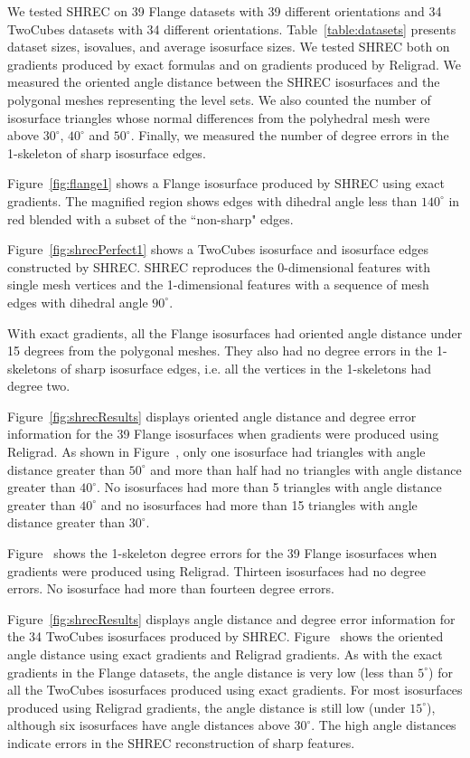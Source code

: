 We tested SHREC on 39 Flange datasets with 39 different orientations
and 34 TwoCubes datasets with 34 different orientations.
Table~\ref{table:datasets} presents dataset sizes, isovalues,
and average isosurface sizes.
We tested SHREC both on gradients produced by exact formulas 
and on gradients produced by Religrad.
We measured the oriented angle distance between the SHREC isosurfaces
and the polygonal meshes representing the level sets.
We also counted the number of isosurface triangles whose normal differences
from the polyhedral mesh were above $30^\circ$, $40^\circ$ and $50^\circ$.
Finally, we measured the number of degree errors 
in the 1-skeleton of sharp isosurface edges.

Figure~\ref{fig:flange1} shows a Flange isosurface produced by SHREC
using exact gradients.
The magnified region shows edges with dihedral angle
less than $140^\circ$ in red blended with a subset of the ``non-sharp"
edges.

Figure~\ref{fig:shrecPerfect1} shows a TwoCubes isosurface
and isosurface edges constructed by SHREC.
SHREC reproduces the 0-dimensional features with single mesh vertices
and the 1-dimensional features with a sequence of mesh edges
with dihedral angle $90^\circ$.

With exact gradients,
all the Flange isosurfaces had oriented angle distance
under 15 degrees from the polygonal meshes.
They also had no degree errors in the 1-skeletons
of sharp isosurface edges,
i.e. all the vertices in the 1-skeletons had degree two.

Figure~\ref{fig:shrecResults} displays oriented angle distance and degree error
information for the 39 Flange isosurfaces
when gradients were produced using Religrad.
As shown in Figure~,
only one isosurface had triangles with angle distance greater than $50^\circ$
and more than half had no triangles with angle distance greater than $40^\circ$.
No isosurfaces had more than 5 triangles with angle distance
greater than $40^\circ$
and no isosurfaces had more than 15 triangles with angle distance greater
than $30^\circ$.

Figure~\protect{} shows the 1-skeleton degree errors
for the 39 Flange isosurfaces when gradients were produced using Religrad.
Thirteen isosurfaces had no degree errors.
No isosurface had more than fourteen degree errors.

Figure~\ref{fig:shrecResults} displays angle distance and degree error
information for the 34 TwoCubes isosurfaces produced by SHREC.
Figure~ shows the oriented angle distance
using exact gradients and Religrad gradients.
As with the exact gradients in the Flange datasets,
the angle distance is very low (less than $5^\circ$)
for all the TwoCubes isosurfaces produced using exact gradients.
For most isosurfaces produced using Religrad gradients, 
the angle distance is still low (under $15^\circ$),
although six isosurfaces have angle distances above $30^\circ$.
The high angle distances indicate errors in the SHREC reconstruction 
of sharp features.

